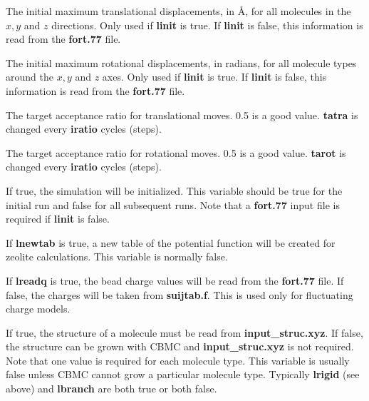 \documentclass[12pt,letterpaper]{article}
\begin{document}
 The initial maximum translational
displacements, in {\AA}, for all molecules in the $x, y$ and $z$ directions.  
Only used if {\textbf {linit}} is true.
If {\textbf{linit}} is false, this information is read from the {\textbf{ fort.77} }file.

 The initial maximum rotational
displacements, in radians, for all molecule types around the $x, y$ and $z$ axes.
Only used if {\textbf {linit}} is true.
If {\textbf{linit}} is false, this information is read from the {\textbf{ fort.77} }file.

 The target acceptance ratio for translational moves.
0.5 is a good value.  {\textbf{tatra}} is changed every {\textbf {iratio}} cycles (steps).

 The target acceptance ratio for rotational moves.
0.5 is a good value.  {\textbf{tarot}} is changed every {\textbf {iratio}} cycles (steps).

 If true, the simulation will be initialized.
This variable should be true for the initial run and false for all subsequent runs.  
Note that a {\textbf{fort.77}} input file is required if {\textbf{linit}} is false.

 If {\textbf{lnewtab}} is true, a new table of the potential function
will be created for zeolite calculations.  This variable is normally false.

 If {\textbf{lreadq}} is true, the bead charge values will be read from the
{\textbf{fort.77}} file.  If false, the charges will be taken from {\textbf{suijtab.f}}.
This is used only for fluctuating charge models.


 If true, the structure of a molecule must be read from 
{\textbf{input\_struc.xyz}}.  If false, the structure can be grown with CBMC and 
{\textbf{input\_struc.xyz}} is not required.
Note that one value is required for each molecule type.  This variable is usually false
unless CBMC cannot grow a particular molecule type.
Typically {\textbf{lrigid}} (see above) and {\textbf{lbranch}} are both true or both false.
\end{document}
